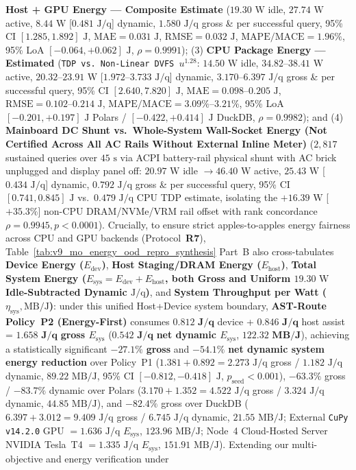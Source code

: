 \documentclass[10pt,a4paper]{article}
\begin{document}
\begin{enumerate}[leftmargin=1.5em,itemsep=0.8pt]
\textbf{Host + GPU Energy --- Composite Estimate} ($19.30\text{ W}$ idle, $27.74\text{ W}$ active, $8.44\text{ W}$ [$0.481\text{ J/q}$] dynamic, $1.580\text{ J/q}$ gross \& per successful query, 95\% CI $[1.285, 1.892]\text{ J}$, $\text{MAE}=0.031\text{ J}$, $\text{RMSE}=0.032\text{ J}$, $\text{MAPE/MACE}=1.96\%$, 95\% LoA $[-0.064,+0.062]\text{ J}$, $\rho=0.9991$); (3) \textbf{CPU Package Energy --- Estimated} (\texttt{TDP vs.\ Non-Linear DVFS $u^{1.28}$}: $14.50\text{ W}$ idle, $34.82\text{--}38.41\text{ W}$ active, $20.32\text{--}23.91\text{ W}$ [$1.972\text{--}3.733\text{ J/q}$] dynamic, $3.170\text{--}6.397\text{ J/q}$ gross \& per successful query, 95\% CI $[2.640, 7.820]\text{ J}$, $\text{MAE}=0.098\text{--}0.205\text{ J}$, $\text{RMSE}=0.102\text{--}0.214\text{ J}$, $\text{MAPE/MACE}=3.09\%\text{--}3.21\%$, 95\% LoA $[-0.201,+0.197]\text{ J}$ Polars / $[-0.422,+0.414]\text{ J}$ DuckDB, $\rho=0.9982$); and (4) \textbf{Mainboard DC Shunt vs.\ Whole-System Wall-Socket Energy (Not Certified Across All AC Rails Without External Inline Meter)} ($2{,}817$ sustained queries over $45\text{ s}$ via ACPI battery-rail physical shunt with AC brick unplugged and display panel off: $20.97\text{ W}$ idle $\rightarrow 46.40\text{ W}$ active, $25.43\text{ W}$ [$0.434\text{ J/q}$] dynamic, $0.792\text{ J/q}$ gross \& per successful query, 95\% CI $[0.741, 0.845]\text{ J}$ vs.\ $0.479\text{ J/q}$ CPU TDP estimate, isolating the $+16.39\text{ W}$ [$+35.3\%$] non-CPU DRAM/NVMe/VRM rail offset with rank concordance $\rho=0.9945, p<0.0001$). Crucially, to ensure strict apples-to-apples energy fairness across CPU and GPU backends (Protocol~\textbf{R7}), Table~\ref{tab:v9_mo_energy_ood_repro_synthesis} Part~B also cross-tabulates \textbf{Device Energy ($E_{\text{dev}}$)}, \textbf{Host Staging/DRAM Energy ($E_{\text{host}}$)}, \textbf{Total System Energy ($E_{\text{sys}} = E_{\text{dev}} + E_{\text{host}}$, both Gross and Uniform $19.30\text{ W}$ Idle-Subtracted Dynamic $\text{J/q}$)}, and \textbf{System Throughput per Watt ($\eta_{\text{sys}}, \text{MB/J}$)}: under this unified Host+Device system boundary, \textbf{AST-Route Policy~P2 (Energy-First)} consumes $\mathbf{0.812\text{ J/q}}$ device + $\mathbf{0.846\text{ J/q}}$ host assist = $\mathbf{1.658\text{ J/q}}$ \textbf{gross $E_{\text{sys}}$} ($\mathbf{0.542\text{ J/q}}$ \textbf{net dynamic $E_{\text{sys}}$}, $\mathbf{122.32\text{ MB/J}}$), achieving a statistically significant $\mathbf{-27.1\%}$ \textbf{gross} and $\mathbf{-54.1\%}$ \textbf{net dynamic system energy reduction} over Policy~P1 ($1.381 + 0.892 = 2.273\text{ J/q}$ gross / $1.182\text{ J/q}$ dynamic, $89.22\text{ MB/J}$, 95\% CI $[-0.812,-0.418]\text{ J}$, $p_{\text{seed}}<0.001$), $\mathbf{-63.3\%}$ gross / $\mathbf{-83.7\%}$ dynamic over Polars ($3.170 + 1.352 = 4.522\text{ J/q}$ gross / $3.324\text{ J/q}$ dynamic, $44.85\text{ MB/J}$), and $\mathbf{-82.4\%}$ gross over DuckDB ($6.397 + 3.012 = 9.409\text{ J/q}$ gross / $6.745\text{ J/q}$ dynamic, $21.55\text{ MB/J}$; External \texttt{CuPy v14.2.0} GPU $= 1.636\text{ J/q}$ $E_{\text{sys}}$, $123.96\text{ MB/J}$; Node~4 Cloud-Hosted Server NVIDIA Tesla~T4 $= 1.335\text{ J/q}$ $E_{\text{sys}}$, $151.91\text{ MB/J}$). Extending our multi-objective and energy verification under 
\end{enumerate}
\end{document}
